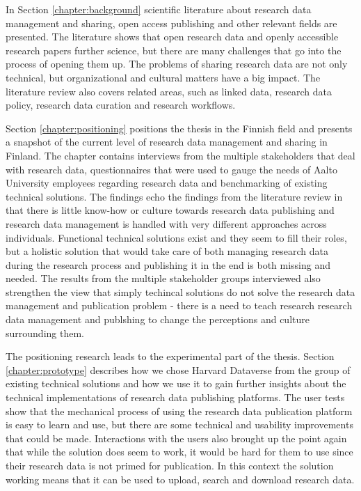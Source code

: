 In Section \ref{chapter:background} scientific literature about research data
management and sharing, open access publishing and other relevant fields are
presented. The literature shows that open research data and openly accessible
research papers further science, but there are many challenges that go into
the process of opening them up. The problems of sharing research data are not
only technical, but organizational and cultural matters have a big impact. The
literature review also covers related areas, such as linked data, research
data policy, research data curation and research workflows.

Section \ref{chapter:positioning} positions the thesis in the Finnish field and
presents a snapshot of the current level of research data management and
sharing in Finland. The chapter contains interviews from the multiple
stakeholders that deal with research data, questionnaires that were used to
gauge the needs of Aalto University employees regarding research data and
benchmarking of existing technical solutions. The findings echo the findings from the
literature review in that there is little know-how or culture towards research
data publishing and research data management is handled with very different
approaches across individuals. Functional technical solutions exist and they
seem to fill their roles, but a holistic solution that would take care of both
managing research data during the research process and publishing it in the end
is both missing and needed. The results from the multiple stakeholder groups
interviewed also strengthen the view that simply techincal solutions do not
solve the research data management and publication problem - there is a need to
teach research research data management and publshing to change the perceptions
and culture surrounding them.

The positioning research leads to the experimental part of the thesis. Section
\ref{chapter:prototype} describes how we chose Harvard Dataverse from the
group of existing technical solutions and how we use it to gain further insights about
the technical implementations of research data publishing platforms. The user tests
show that the mechanical process of using the research data publication
platform is easy to learn and use, but there are some technical and usability
improvements that could be made. Interactions with the users also brought up
the point again that while the solution does seem to work, it would be hard
for them to use since their research data is not primed for publication. In
this context the solution working means that it can be used to upload, search
and download research data.

